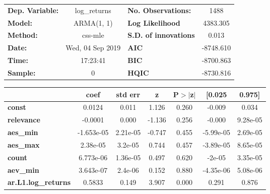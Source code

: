 \begin{center}
\begin{tabular}{lclc}
\toprule
\textbf{Dep. Variable:}     &        log\_returns       & \textbf{  No. Observations:  } &            1488            \\
\textbf{Model:}             &         ARMA(1, 1)        & \textbf{  Log Likelihood     } &          4383.305          \\
\textbf{Method:}            &          css-mle          & \textbf{  S.D. of innovations} &           0.013            \\
\textbf{Date:}              &      Wed, 04 Sep 2019     & \textbf{  AIC                } &         -8748.610          \\
\textbf{Time:}              &          17:23:41         & \textbf{  BIC                } &         -8700.863          \\
\textbf{Sample:}            &             0             & \textbf{  HQIC               } &         -8730.816          \\
\bottomrule
\end{tabular}
\begin{tabular}{lcccccc}
                            & \textbf{coef} & \textbf{std err} & \textbf{z} & \textbf{P$> |$z$|$} & \textbf{[0.025} & \textbf{0.975]}  \\
\midrule
\textbf{const}              &       0.0124  &        0.011     &     1.126  &         0.260        &       -0.009    &        0.034     \\
\textbf{relevance}          &      -0.0001  &        0.000     &    -1.136  &         0.256        &       -0.000    &     9.28e-05     \\
\textbf{aes\_min}           &   -1.653e-05  &     2.21e-05     &    -0.747  &         0.455        &    -5.99e-05    &     2.69e-05     \\
\textbf{aes\_max}           &     2.38e-05  &      3.2e-05     &     0.744  &         0.457        &    -3.89e-05    &     8.65e-05     \\
\textbf{count}              &    6.773e-06  &     1.36e-05     &     0.497  &         0.620        &       -2e-05    &     3.35e-05     \\
\textbf{aev\_min}           &    3.643e-07  &      2.4e-06     &     0.152  &         0.880        &    -4.35e-06    &     5.08e-06     \\
\textbf{ar.L1.log\_returns} &       0.5833  &        0.149     &     3.907  &         0.000        &        0.291    &        0.876     \\

\end{tabular}
\end{center}
